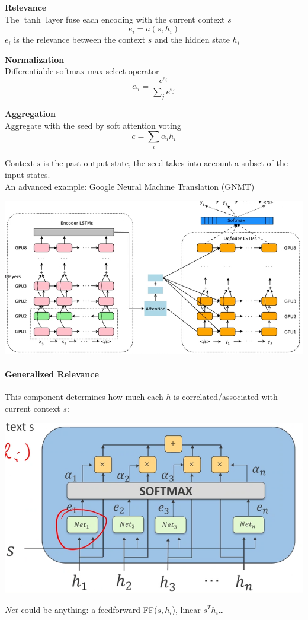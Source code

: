 \documentclass[10pt]{report}
\begin{document}
\begin{list}{}{}
	\item \textbf{Relevance}\\
	The $\tanh$ layer fuse each encoding with the current context $s$
	$$e_i = a(s, h_i)$$
	$e_i$ is the relevance between the context $s$ and the hidden state $h_i$
	\item \textbf{Normalization}\\
	Differentiable softmax max select operator
	$$\alpha_i = \frac{e^{e_i}}{\sum_j e^{e_j}}$$
	\item \textbf{Aggregation}\\
	Aggregate with the seed by soft attention voting
	$$c= \sum_i \alpha_ih_i$$
\end{list}
Context $s$ is the past output state, the seed takes into account a subset of the input states.\\
An advanced example: Google Neural Machine Translation (GNMT)
\begin{center}
	\includegraphics[scale=0.5]{115.png}
\end{center}
\pagebreak
\paragraph{Generalized Relevance} This component determines how much each $h$ is correlated/associated with current context $s$:
\begin{center}
	\includegraphics[scale=0.5]{116.png}
\end{center}
$Net$ could be anything: a feedforward FF($s, h_i$), linear $s^Th_i$\ldots
\end{document}
